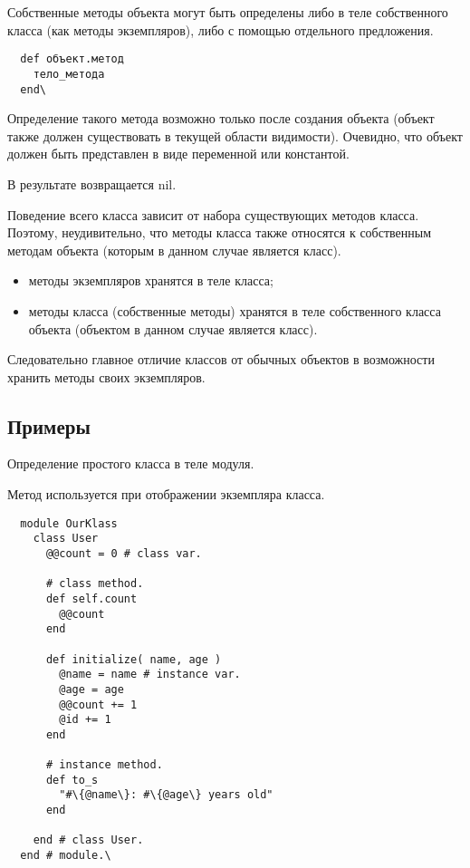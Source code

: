 Собственные методы объекта могут быть определены либо в теле собственного класса (как методы экземпляров), либо с помощью отдельного предложения.

\begin{verbatim}
  def объект.метод
    тело_метода
  end\
\end{verbatim}

Определение такого метода возможно только после создания объекта (объект также должен существовать в текущей области видимости). Очевидно, что объект должен быть представлен в виде переменной или константой.

В результате возвращается nil.

Поведение всего класса зависит от набора существующих методов класса. Поэтому, неудивительно, что методы класса также относятся к собственным методам объекта (которым в данном случае является класс). 

\begin{itemize}
  \item методы экземпляров хранятся в теле класса;
  \item методы класса (собственные методы) хранятся в теле собственного класса объекта (объектом в данном случае является класс).
\end{itemize}

Следовательно главное отличие классов от обычных объектов в возможности хранить методы своих экземпляров.

\subsection{Примеры}

Определение простого класса в теле модуля.

Метод  используется при отображении экземпляра класса.

\begin{verbatim}
  module OurKlass
    class User
      @@count = 0 # class var.

      # class method.
      def self.count
        @@count
      end

      def initialize( name, age )
        @name = name # instance var.
        @age = age
        @@count += 1
        @id += 1
      end

      # instance method.
      def to_s
        "#\{@name\}: #\{@age\} years old"
      end

    end # class User.
  end # module.\
\end{verbatim}

